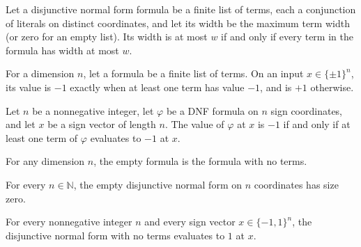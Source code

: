 \begin{theorem}
\label{FABL.DNFFormula.width_le_iff}
\leanok
{}
Let a disjunctive normal form formula be a finite list of terms, each a conjunction of
literals on distinct coordinates, and let its width be the maximum term width (or zero
for an empty list). Its width is at most $w$ if and only if every term in the formula
has width at most $w$.
\end{theorem}

\begin{definition}
\label{FABL.DNFFormula.eval}
\leanok
{}
For a dimension $n$, let a formula be a finite list of terms. On an input
$x\in\{\pm1\}^n$, its value is $-1$ exactly when at least one term has value $-1$, and
is $+1$ otherwise.
\end{definition}

\begin{theorem}
\label{FABL.DNFFormula.eval_eq_neg_one_iff}
\leanok
{}
Let $n$ be a nonnegative integer, let $\varphi$ be a DNF formula on $n$ sign
coordinates, and let $x$ be a sign vector of length $n$. The value of $\varphi$ at $x$
is $-1$ if and only if at least one term of $\varphi$ evaluates to $-1$ at $x$.
\end{theorem}

\begin{definition}
\label{FABL.DNFFormula.empty}
\leanok
{}
For any dimension $n$, the empty formula is the formula with no terms.
\end{definition}

\begin{theorem}
\label{FABL.DNFFormula.size_empty}
\leanok
{}
For every $n\in\mathbb N$, the empty disjunctive normal form on $n$ coordinates has size
zero.
\end{theorem}

\begin{theorem}
\label{FABL.DNFFormula.eval_empty}
\leanok
{}
For every nonnegative integer $n$ and every sign vector $x\in\{−1,1\}^n$, the
disjunctive normal form with no terms evaluates to $1$ at $x$.
\end{theorem}

